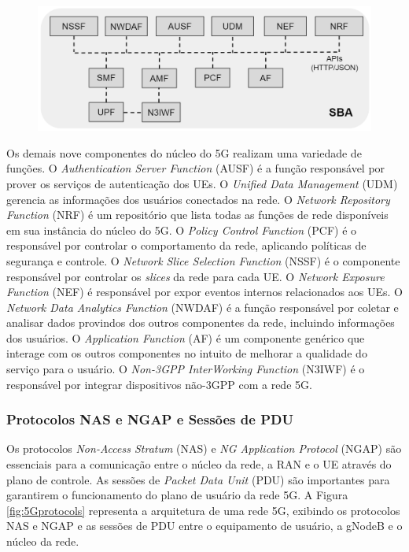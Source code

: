 \begin{figure}
    \centering
    \includegraphics[width=1\textwidth]{TG1/Images/Core5G.png}
    \label{fig:5Gcore}
\end{figure}

Os demais nove componentes do núcleo do 5G realizam uma variedade de funções.
O \textit{Authentication Server Function} (AUSF) é a função responsável por prover os serviços de autenticação dos UEs.
O \textit{Unified Data Management} (UDM) gerencia as informações dos usuários conectados na rede.
O \textit{Network Repository Function} (NRF) é um repositório que lista todas as funções de rede disponíveis em sua instância do núcleo do 5G.
O \textit{Policy Control Function} (PCF) é o responsável por controlar o comportamento da rede, aplicando políticas de segurança e controle.
O \textit{Network Slice Selection Function} (NSSF) é o componente responsável por controlar os \textit{slices} da rede para cada UE.
O \textit{Network Exposure Function} (NEF) é responsável por expor eventos internos relacionados aos UEs.
O \textit{Network Data Analytics Function} (NWDAF) é a função responsável por coletar e analisar dados provindos dos outros componentes da rede, incluindo informações dos usuários.
O \textit{Application Function} (AF) é um componente genérico que interage com os outros componentes no intuito de melhorar a qualidade do serviço para o usuário.
O \textit{Non-3GPP InterWorking Function} (N3IWF) é o responsável por integrar dispositivos não-3GPP com a rede 5G.

\subsubsection{Protocolos NAS e NGAP e Sessões de PDU}

Os protocolos \textit{Non-Access Stratum} (NAS) e \textit{NG Application Protocol} (NGAP) são essenciais para a comunicação entre o núcleo da rede, a RAN e o UE através do plano de controle.
As sessões de \textit{Packet Data Unit} (PDU) são importantes para garantirem o funcionamento do plano de usuário da rede 5G.
A Figura \ref{fig:5Gprotocols} representa a arquitetura de uma rede 5G, exibindo os protocolos NAS e NGAP e as sessões de PDU entre o equipamento de usuário, a gNodeB e o núcleo da rede.

